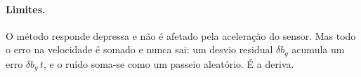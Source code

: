 \paragraph{Limites.} O método responde depressa e não é afetado pela
aceleração do sensor. Mas todo o erro na velocidade é somado e nunca sai: um
desvio residual $\delta b_g$ acumula um erro $\delta b_g\,t$, e o ruído
soma-se como um passeio aleatório. É a deriva.

